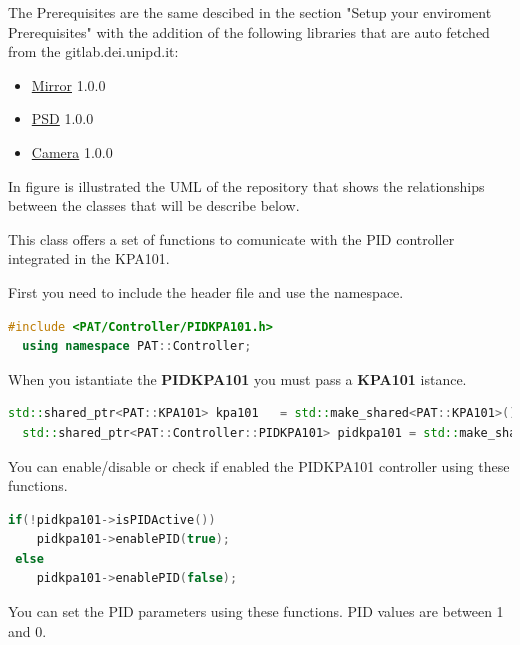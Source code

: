 
The Prerequisites are the same descibed in the section "Setup your enviroment Prerequisites"  with the addition of the following libraries that are auto fetched from the gitlab.dei.unipd.it:

\begin{itemize}
  \tightlist
  \item
        \href{https://gitlab.dei.unipd.it/PAT/Mirror}{Mirror} 1.0.0
  \item
        \href{https://gitlab.dei.unipd.it/PAT/PSD}{PSD} 1.0.0
  \item
        \href{https://gitlab.dei.unipd.it/PAT/Camera}{Camera} 1.0.0
\end{itemize}

In figure  is illustrated the UML of the repository that shows the relationships between the classes that will be describe below.



This class offers a set of functions to comunicate with the PID
controller integrated in the KPA101.

First you need to include the header file and use the namespace.

\begin{lstlisting}[language=c++, gobble=2]
  #include <PAT/Controller/PIDKPA101.h>
  using namespace PAT::Controller;
\end{lstlisting}

When you istantiate the \textbf{PIDKPA101} you must pass a
\textbf{KPA101} istance.

\begin{lstlisting}[language=c++, gobble=2]
  std::shared_ptr<PAT::KPA101> kpa101   = std::make_shared<PAT::KPA101>();
  std::shared_ptr<PAT::Controller::PIDKPA101> pidkpa101 = std::make_shared<PAT::Controller::PIDKPA101>(kpa101);
\end{lstlisting}


You can enable/disable or check if enabled the PIDKPA101 controller
using these functions.

\begin{lstlisting}[language=c++, gobble=2]
  if(!pidkpa101->isPIDActive())
    pidkpa101->enablePID(true);
 else
    pidkpa101->enablePID(false); 
\end{lstlisting}


You can set the PID parameters using these functions. PID values are
between 1 and 0.

